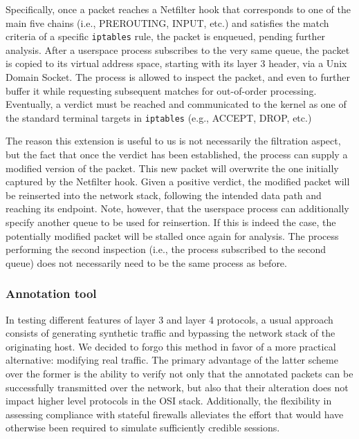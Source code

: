 Specifically, once a packet reaches a Netfilter hook that corresponds to one of the main five chains (i.e., PREROUTING, INPUT, etc.) and satisfies the match criteria of a specific \texttt{iptables} rule, the packet is enqueued, pending further analysis. After a userspace process subscribes to the very same queue, the packet is copied to its virtual address space, starting with its layer 3 header, via a Unix Domain Socket. The process is allowed to inspect the packet, and even to further buffer it while requesting subsequent matches for out-of-order processing. Eventually, a verdict must be reached and communicated to the kernel as one of the standard terminal targets in \texttt{iptables} (e.g., ACCEPT, DROP, etc.)

The reason this extension is useful to us is not necessarily the filtration aspect, but the fact that once the verdict has been established, the process can supply a modified version of the packet. This new packet will overwrite the one initially captured by the Netfilter hook. Given a positive verdict, the modified packet will be reinserted into the network stack, following the intended data path and reaching its endpoint. Note, however, that the userspace process can additionally specify another queue to be used for reinsertion. If this is indeed the case, the potentially modified packet will be stalled once again for analysis. The process performing the second inspection (i.e., the process subscribed to the second queue) does not necessarily need to be the same process as before.

\subsubsection{Annotation tool}
\label{extend:ops:architecture:annotation}

In testing different features of layer 3 and layer 4 protocols, a usual approach consists of generating synthetic traffic and bypassing the network stack of the originating host. We decided to forgo this method in favor of a more practical alternative: modifying real traffic. The primary advantage of the latter scheme over the former is the ability to verify not only that the annotated packets can be successfully transmitted over the network, but also that their alteration does not impact higher level protocols in the OSI stack. Additionally, the flexibility in assessing compliance with stateful firewalls alleviates the effort that would have otherwise been required to simulate sufficiently credible sessions.

